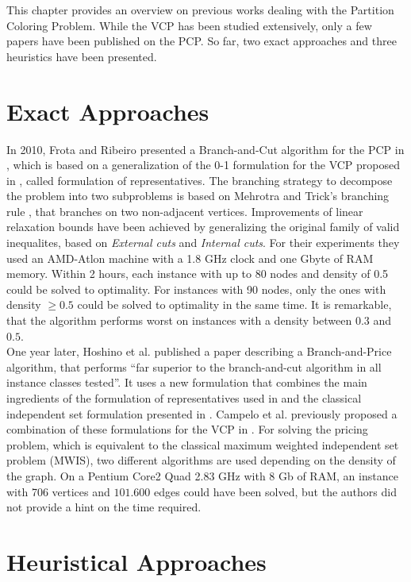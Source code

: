 This chapter provides an overview on previous works dealing with the Partition Coloring Problem. While the VCP has been studied extensively, only a few papers have been published on the PCP. So far, two exact approaches and three heuristics have been presented.

\section{Exact Approaches}

In 2010, Frota and Ribeiro presented a Branch-and-Cut algorithm for the PCP in \cite{frota-07}, which is based on a generalization of the 0-1 formulation for the VCP proposed in \cite{campelo-05,campelo-04}, called formulation of representatives. The branching strategy to decompose the problem into two subproblems is based on Mehrotra and Trick's branching rule \cite{trick-96}, that branches on two non-adjacent vertices. Improvements of linear relaxation bounds have been achieved by generalizing the original family of valid inequalites\cite{campelo-05,campelo-04}, based on \textit{External cuts} and \textit{Internal cuts}. For their experiments they used an AMD-Atlon machine with a 1.8 GHz clock and one Gbyte of RAM memory. Within 2 hours, each instance with up to 80 nodes and density of 0.5 could be solved to optimality. For instances with 90 nodes, only the ones with density $\geq 0.5$ could be solved to optimality in the same time. It is remarkable, that the algorithm performs worst on instances with a density between $0.3$ and $0.5$.\\
One year later, Hoshino et al. published a paper describing a Branch-and-Price algorithm, that performs ``far superior to the branch-and-cut algorithm in all instance classes tested''\cite{hoshino-11}. It uses a new formulation that combines the main ingredients of the formulation of representatives used in \cite{frota-07} and the classical independent set formulation presented in \cite{trick-96}. Campelo et al. previously proposed a combination of these formulations for the VCP in \cite{campelo-052}. For solving the pricing problem, which is equivalent to the classical maximum weighted independent set problem (MWIS), two different algorithms are used depending on the density of the graph. On a Pentium Core2 Quad 2.83 GHz with 8 Gb of RAM, an instance with 706 vertices and $101.600$ edges could have been solved, but the authors did not provide a hint on the time required.

\section{Heuristical Approaches}

